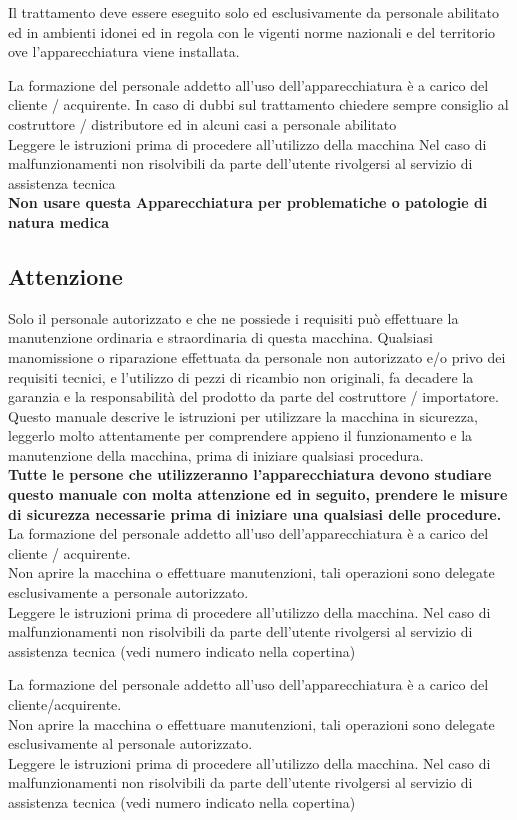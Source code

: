 \documentclass[a4paper]{article}
\begin{document}
Il trattamento deve essere eseguito solo ed esclusivamente da personale abilitato ed in ambienti idonei ed in regola con le vigenti norme nazionali e del territorio ove l'apparecchiatura viene installata.

La formazione del personale addetto all'uso dell'apparecchiatura è a carico del cliente / acquirente. In caso di dubbi sul trattamento chiedere sempre consiglio al costruttore / distributore ed in alcuni casi a personale abilitato\\
Leggere le istruzioni prima di procedere all'utilizzo della macchina Nel caso di malfunzionamenti non risolvibili da parte dell'utente rivolgersi al servizio di assistenza tecnica\\
\textbf{Non usare questa Apparecchiatura per problematiche o patologie di natura medica}

\subsection{Attenzione}
Solo il personale autorizzato e che ne possiede i requisiti può effettuare la manutenzione ordinaria e straordinaria di questa macchina. Qualsiasi manomissione o riparazione effettuata da personale non autorizzato e/o privo dei requisiti tecnici, e l'utilizzo di pezzi di ricambio non originali, fa decadere la garanzia e la responsabilità del prodotto da parte del costruttore / importatore.\\
Questo manuale descrive le istruzioni per utilizzare la macchina in sicurezza, leggerlo molto attentamente per comprendere appieno il funzionamento e la manutenzione della macchina, prima di iniziare qualsiasi procedura.\\
\textbf{Tutte le persone che utilizzeranno l'apparecchiatura devono studiare questo manuale con molta attenzione ed in seguito, prendere le misure di sicurezza necessarie prima di iniziare una qualsiasi delle procedure.}\\
La formazione del personale addetto all'uso dell'apparecchiatura è a carico del cliente / acquirente.\\
Non aprire la macchina o effettuare manutenzioni, tali operazioni sono delegate esclusivamente a personale autorizzato.\\
Leggere le istruzioni prima di procedere all'utilizzo della macchina. Nel caso di malfunzionamenti non risolvibili da parte dell'utente rivolgersi al servizio di assistenza tecnica (vedi numero indicato nella copertina)

La formazione del personale addetto all'uso dell'apparecchiatura è a carico del cliente/acquirente.\\
Non aprire la macchina o effettuare manutenzioni, tali operazioni sono delegate esclusivamente al personale autorizzato.\\
Leggere le istruzioni prima di procedere all'utilizzo della macchina. Nel caso di malfunzionamenti non risolvibili da parte dell'utente rivolgersi al servizio di assistenza tecnica (vedi numero indicato nella copertina)
\end{document}
